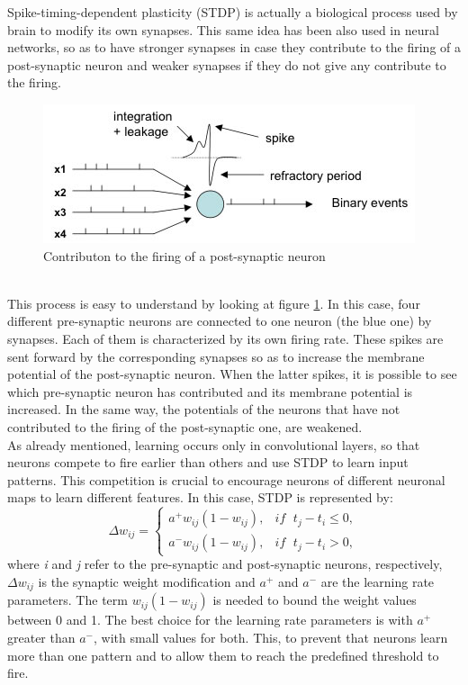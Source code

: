 \documentclass[11pt,a4paper]{scrartcl}
\begin{document}
Spike-timing-dependent plasticity (STDP) is actually a biological process used by brain to modify its own synapses. This same idea has been also used in neural networks, so as to have stronger synapses in case they contribute to the firing of a post-synaptic neuron and weaker synapses if they do not give any contribute to the firing.\\
\begin{figure}[h]
	\centering
	\includegraphics[width=0.75\linewidth]{images/spikes}
	\caption{Contributon to the firing of a post-synaptic neuron}
	\label{fig:spikes}
\end{figure}\\
This process is easy to understand by looking at figure \ref{fig:spikes}. In this case, four different pre-synaptic neurons are connected to one neuron (the blue one) by synapses. Each of them is characterized by its own firing rate. These spikes are sent forward by the corresponding synapses so as to increase the membrane potential of the post-synaptic neuron. When the latter spikes, it is possible to see which pre-synaptic neuron has contributed and its membrane potential is increased. In the same way, the potentials of the neurons that have not contributed to the firing of the post-synaptic one, are weakened.\\
As already mentioned, learning occurs only in convolutional layers, so that neurons compete to fire earlier than others and use STDP to learn input patterns. This competition is crucial to encourage neurons of different neuronal maps to learn different features. In this case, STDP is represented by:
\begin{equation*}
	\Delta w_{ij} = \begin{cases}
		a^{+}w_{ij}(1-w_{ij}), & \textit{if }\; t_{j}-t_{i} \leq 0,\\
		a^{-}w_{ij}(1-w_{ij}), & \textit{if }\; t_{j}-t_{i} > 0,
	\end{cases}
\end{equation*}
where \textit{i} and \textit{j} refer to the pre-synaptic and post-synaptic neurons, respectively, $ \Delta w_{ij} $ is the synaptic weight modification and $ a^{+} $ and $ a^{-} $ are the learning rate parameters. The term $ w_{ij}(1-w_{ij}) $ is needed to bound the weight values between 0 and 1. The best choice for the learning rate parameters is with $ a^{+} $ greater than $ a^{-} $, with small values for both. This, to prevent that neurons learn more than one pattern and to allow them to reach the predefined threshold to fire.\\
\end{document}
